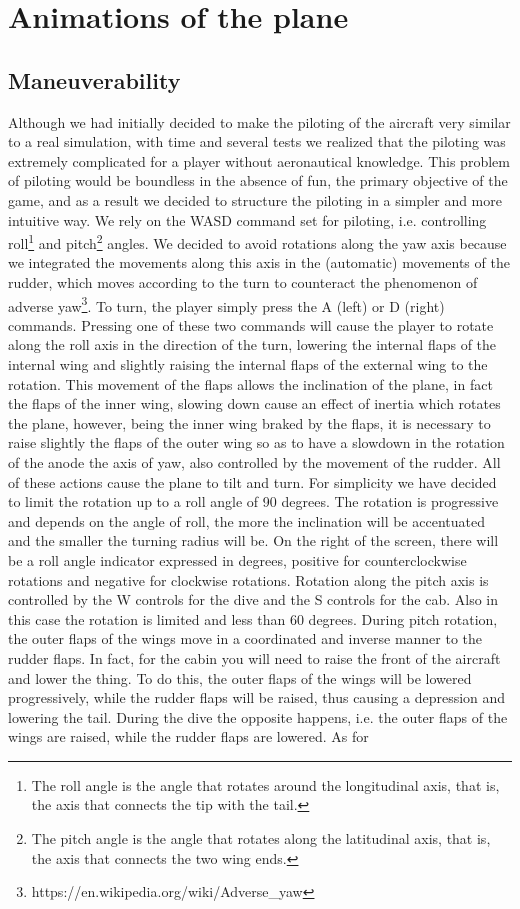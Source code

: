 \documentclass{article}
\begin{document}
\newpage
\section*{Animations of the plane}
\subsection*{Maneuverability}
Although we had initially decided to make the piloting of the aircraft very similar to a real simulation, with time and several tests we realized that the piloting was extremely complicated for a player without aeronautical knowledge. This problem of piloting would be boundless in the absence of fun, the primary objective of the game, and as a result we decided to structure the piloting in a simpler and more intuitive way. We rely on the WASD command set for piloting, i.e. controlling roll\footnote{The roll angle is the angle that rotates around the longitudinal axis, that is, the axis that connects the tip with the tail.} and pitch\footnote{The pitch angle is the angle that rotates along the latitudinal axis, that is, the axis that connects the two wing ends.} angles. We decided to avoid rotations along the yaw axis because we integrated the movements along this axis in the (automatic) movements of the rudder, which moves according to the turn to counteract the phenomenon of adverse yaw\footnote{https://en.wikipedia.org/wiki/Adverse\_yaw}. To turn, the player simply press the A (left) or D (right) commands. Pressing one of these two commands will cause the player to rotate along the roll axis in the direction of the turn, lowering the internal flaps of the internal wing and slightly raising the internal flaps of the external wing to the rotation. This movement of the flaps allows the inclination of the plane, in fact the flaps of the inner wing, slowing down cause an effect of inertia which rotates the plane, however, being the inner wing braked by the flaps, it is necessary to raise slightly the flaps of the outer wing so as to have a slowdown in the rotation of the anode the axis of yaw, also controlled by the movement of the rudder. All of these actions cause the plane to tilt and turn. For simplicity we have decided to limit the rotation up to a roll angle of 90 degrees. The rotation is progressive and depends on the angle of roll, the more the inclination will be accentuated and the smaller the turning radius will be. On the right of the screen, there will be a roll angle indicator expressed in degrees, positive for counterclockwise rotations and negative for clockwise rotations. Rotation along the pitch axis is controlled by the W controls for the dive and the S controls for the cab. Also in this case the rotation is limited and less than 60 degrees. During pitch rotation, the outer flaps of the wings move in a coordinated and inverse manner to the rudder flaps. In fact, for the cabin you will need to raise the front of the aircraft and lower the thing. To do this, the outer flaps of the wings will be lowered progressively, while the rudder flaps will be raised, thus causing a depression and lowering the tail. During the dive the opposite happens, i.e. the outer flaps of the wings are raised, while the rudder flaps are lowered. As for 
\end{document}
